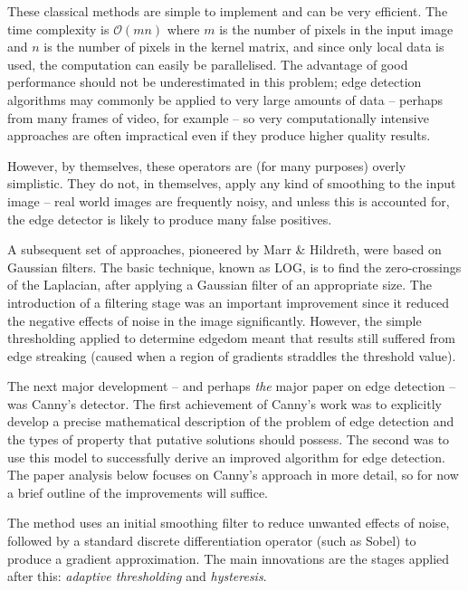 \documentclass{acm_proc_article-sp}
\begin{document}

These classical methods are simple to implement and can be very efficient.  The
time complexity is $\mathcal{O}(mn)$ where $m$ is the number of pixels in the
input image and $n$ is the number of pixels in the kernel matrix, and since
only local data is used, the computation can easily be parallelised. The
advantage of good performance should not be underestimated in this problem;
edge detection algorithms may commonly be applied to very large amounts of data
-- perhaps from many frames of video, for example -- so very computationally
intensive approaches are often impractical even if they produce higher quality 
results.

However, by themselves, these operators are (for many purposes) overly
simplistic. They do not, in themselves, apply any kind of smoothing to the
input image -- real world images are frequently noisy, and unless this is
accounted for, the edge detector is likely to produce many false positives.

A subsequent set of approaches, pioneered by Marr \&
Hildreth\cite{marr1980theory}, were based on Gaussian filters.  The basic
technique, known as LOG, is to find the zero-crossings of the Laplacian, after
applying a Gaussian filter of an appropriate size. The introduction of a
filtering stage was an important improvement since it reduced the negative
effects of noise in the image significantly. However, the simple thresholding
applied to determine edgedom meant that results still suffered from edge
streaking (caused when a region of gradients straddles the threshold value).

The next major development -- and perhaps \emph{the} major paper on edge
detection -- was Canny's detector\cite{4767851}. The first achievement of
Canny's work was to explicitly develop a precise mathematical description of
the problem of edge detection and the types of property that putative solutions
should possess. The second was to use this model to successfully derive an
improved algorithm for edge detection. The paper analysis below focuses on
Canny's approach in more detail, so for now a brief outline of the improvements
will suffice.

The method uses an initial smoothing filter to reduce unwanted effects of
noise, followed by a standard discrete differentiation operator (such as Sobel)
to produce a gradient approximation. The main innovations are the stages
applied after this: \emph{adaptive thresholding} and \emph{hysteresis}.
\end{document}
